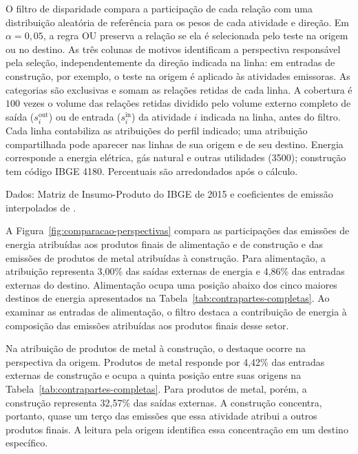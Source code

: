 \begin{table}[htbp]
\begin{notas}
\par
O filtro de disparidade compara a participação de cada relação com uma distribuição aleatória de referência para os pesos de cada atividade e direção. Em $\alpha=0{,}05$, a regra OU preserva a relação se ela é selecionada pelo teste na origem ou no destino. As três colunas de motivos identificam a perspectiva responsável pela seleção, independentemente da direção indicada na linha: em entradas de construção, por exemplo, o teste na origem é aplicado às atividades emissoras. As categorias são exclusivas e somam as relações retidas de cada linha. A cobertura é $100$ vezes o volume das relações retidas dividido pelo volume externo completo de saída ($s_i^{\mathrm{out}}$) ou de entrada ($s_i^{\mathrm{in}}$) da atividade $i$ indicada na linha, antes do filtro. Cada linha contabiliza as atribuições do perfil indicado; uma atribuição compartilhada pode aparecer nas linhas de sua origem e de seu destino. Energia corresponde a energia elétrica, gás natural e outras utilidades (3500); construção tem código IBGE 4180. Percentuais são arredondados após o cálculo.
\par
Dados: Matriz de Insumo-Produto do IBGE de 2015 e coeficientes de emissão interpolados de \textcite{sanguinetAzzoni2024}.
\end{notas}
\end{table}

A Figura~\ref{fig:comparacao-perspectivas} compara as participações das emissões de energia atribuídas aos produtos finais de alimentação e de construção e das emissões de produtos de metal atribuídas à construção. Para alimentação, a atribuição representa 3,00\% das saídas externas de energia e 4,86\% das entradas externas do destino. Alimentação ocupa uma posição abaixo dos cinco maiores destinos de energia apresentados na Tabela~\ref{tab:contrapartes-completas}. Ao examinar as entradas de alimentação, o filtro destaca a contribuição de energia à composição das emissões atribuídas aos produtos finais desse setor.

Na atribuição de produtos de metal à construção, o destaque ocorre na perspectiva da origem. Produtos de metal responde por 4,42\% das entradas externas de construção e ocupa a quinta posição entre suas origens na Tabela~\ref{tab:contrapartes-completas}. Para produtos de metal, porém, a construção representa 32,57\% das saídas externas. A construção concentra, portanto, quase um terço das emissões que essa atividade atribui a outros produtos finais. A leitura pela origem identifica essa concentração em um destino específico.

